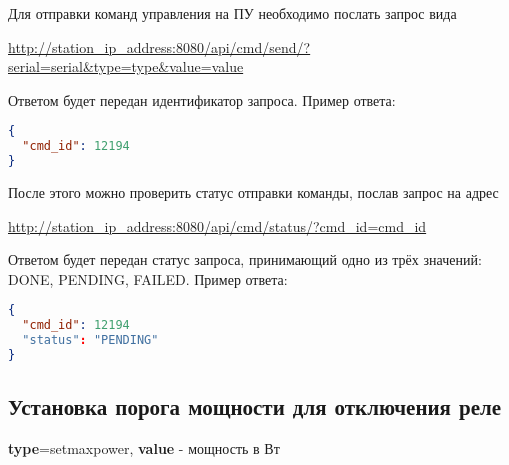 Для отправки команд управления на ПУ необходимо послать запрос вида 
\smallskip

\url{http://station_ip_address:8080/api/cmd/send/?serial=serial&type=type&value=value} 

\bigskip

Ответом будет передан идентификатор запроса. Пример ответа: 

\bigskip

\begin{lstlisting}[language=json,firstnumber=1]
{
  "cmd_id": 12194
}
\end{lstlisting}

После этого можно проверить статус отправки команды, послав запрос на адрес

\smallskip

\url{http://station_ip_address:8080/api/cmd/status/?cmd_id=cmd_id}

\bigskip

Ответом будет передан статус запроса, принимающий одно из трёх значений: DONE, PENDING, FAILED. Пример ответа:

\begin{lstlisting}[language=json,firstnumber=1]
{
  "cmd_id": 12194
  "status": "PENDING"
}
\end{lstlisting}

\subsection{Установка порога мощности для отключения реле}

\textbf{type}=setmaxpower, \textbf{value} - мощность в Вт